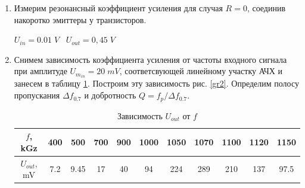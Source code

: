 \documentclass[a4paper]{article}
\begin{document}
\begin{enumerate}
    \item Измерим резонансный коэффициент усиления для случая $R=0$, соединив накоротко эмиттеры у транзисторов. \par 
    $U_{in} = 0.01 \;V \;\;\; U_{out} = 0,45\; V$
    \begin{center}
    \end{center}


    \item Снимем зависимость коэффициента усиления от частоты входного сигнала при амплитуде $U_{m_{in}} = 20\; mV$, соответсвующей линейному участку АЧХ и занесем в таблицу \ref{t2}. Построим эту зависимость рис. \ref{gr2}.
    Определим полосу пропускания $\Delta f_{0.7}$ и добротность $Q = f_{p}/\Delta f_{0.7}$. \par 

    \begin{center}
    \end{center}

    \begin{center}
    \end{center}

    \begin{table}[H]
        \centering
        \begin{center}
        \end{center}
        \vspace{0.1cm}
        \begin{tabular}{|c|c|c|c|c|c|c|c|c|c|c|}
            \hline
            $f$, kGz  &400& 500& 700& 900& 1000& 1050& 1070& 1100& 1120& 1150  \\ 
            \hline
            $U_{out}$, mV &7.2& 9.45& 17& 40& 94& 224& 289& 210& 137& 97.5  \\
            \hline
            \end{tabular}
            \caption{Зависимость $U_{out}$  от $f$}
            \label{t2}
    \end{table}


\end{enumerate}
\end{document}
